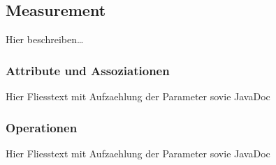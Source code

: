 \subsection{Measurement}

Hier beschreiben\ldots

\subsubsection{Attribute und Assoziationen}
Hier Fliesstext mit Aufzaehlung der Parameter sovie JavaDoc

\subsubsection{Operationen}

Hier Fliesstext mit Aufzaehlung der Parameter sovie JavaDoc

\blindtext